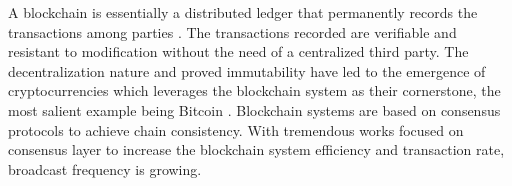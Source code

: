 %

A blockchain is essentially a distributed ledger that permanently records the transactions among parties \cite{iansiti2018truth}. The transactions recorded are verifiable and resistant to modification without the need of a centralized third party. The decentralization nature and proved immutability have led to the emergence of cryptocurrencies which leverages the blockchain system as their cornerstone, the most salient example being Bitcoin \cite{nakamoto2008bitcoin}. Blockchain systems are based on consensus protocols to achieve chain consistency. With tremendous works focused on consensus layer to increase the blockchain system efficiency and transaction rate, broadcast frequency is growing.



